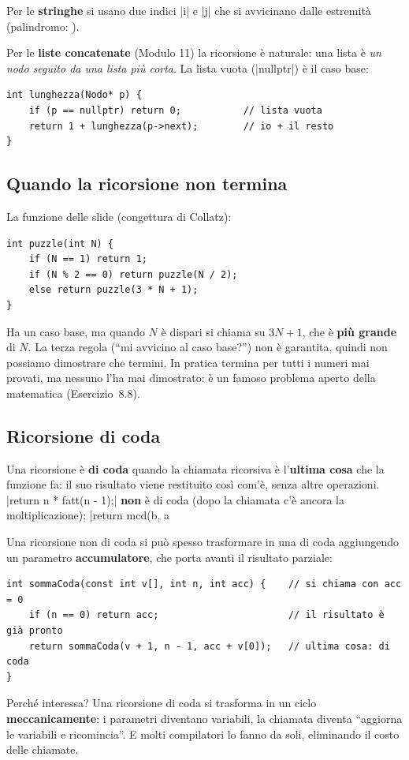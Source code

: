 Per le \textbf{stringhe} si usano due indici \cc|i| e \cc|j| che si avvicinano
dalle estremità (palindromo: ).

Per le \textbf{liste concatenate} (Modulo 11) la ricorsione è naturale: una lista è
\emph{un nodo seguito da una lista più corta}. La lista vuota (\cc|nullptr|) è il
caso base:
\begin{lstlisting}
int lunghezza(Nodo* p) {
    if (p == nullptr) return 0;           // lista vuota
    return 1 + lunghezza(p->next);        // io + il resto
}
\end{lstlisting}

\subsection*{Quando la ricorsione non termina}

La funzione  delle slide (congettura di Collatz):
\begin{lstlisting}
int puzzle(int N) {
    if (N == 1) return 1;
    if (N % 2 == 0) return puzzle(N / 2);
    else return puzzle(3 * N + 1);
}
\end{lstlisting}
Ha un caso base, ma quando $N$ è dispari si chiama su $3N + 1$, che è \textbf{più
grande} di $N$. La terza regola (``mi avvicino al caso base?'') non è
garantita, quindi non possiamo dimostrare che termini. In pratica termina per tutti
i numeri mai provati, ma nessuno l'ha mai dimostrato: è un famoso problema aperto
della matematica (Esercizio~8.8).

\subsection*{Ricorsione di coda}

Una ricorsione è \textbf{di coda} quando la chiamata ricorsiva è l'\textbf{ultima
cosa} che la funzione fa: il suo risultato viene restituito così com'è, senza
altre operazioni. \cc|return n * fatt(n - 1);| \textbf{non} è di coda (dopo la
chiamata c'è ancora la moltiplicazione); \cc|return mcd(b, a %

Una ricorsione non di coda si può spesso trasformare in una di coda aggiungendo un
parametro \textbf{accumulatore}, che porta avanti il risultato parziale:
\begin{lstlisting}
int sommaCoda(const int v[], int n, int acc) {    // si chiama con acc = 0
    if (n == 0) return acc;                       // il risultato è già pronto
    return sommaCoda(v + 1, n - 1, acc + v[0]);   // ultima cosa: di coda
}
\end{lstlisting}
Perché interessa? Una ricorsione di coda si trasforma in un ciclo
\textbf{meccanicamente}: i parametri diventano variabili, la chiamata diventa
``aggiorna le variabili e ricomincia''. E molti compilatori lo fanno da soli,
eliminando il costo delle chiamate.

